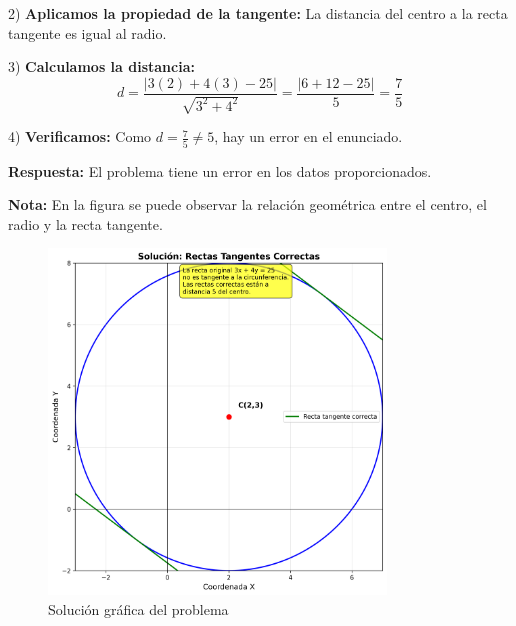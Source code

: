 \begin{ejercicio}
\begin{solucion}
2) \textbf{Aplicamos la propiedad de la tangente:}
   La distancia del centro a la recta tangente es igual al radio.

3) \textbf{Calculamos la distancia:}
   $$d = \frac{|3(2) + 4(3) - 25|}{\sqrt{3^2 + 4^2}} = \frac{|6 + 12 - 25|}{5} = \frac{7}{5}$$

4) \textbf{Verificamos:}
   Como $d = \frac{7}{5} \neq 5$, hay un error en el enunciado.

\textbf{Respuesta:} El problema tiene un error en los datos proporcionados.

\textbf{Nota:} En la figura se puede observar la relación geométrica entre el centro, el radio y la recta tangente.

\begin{figure}[h]
\centering
\includegraphics[width=0.8\textwidth]{imagenes/solucion_circulo_001.png}
\caption{Solución gráfica del problema}
\label{fig:solucion_circulo}
\end{figure}
\end{solucion}
\end{ejercicio} 